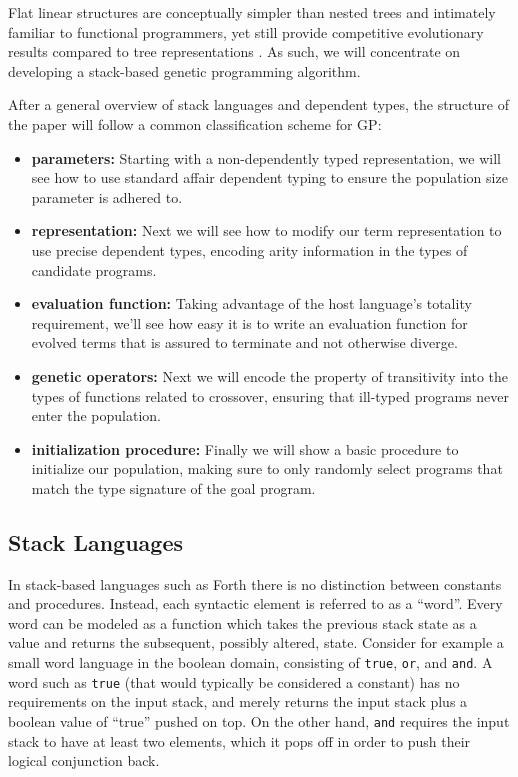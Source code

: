 \documentclass[runningheads,a4paper]{llncs}
\begin{document}
Flat linear structures are conceptually simpler than nested trees and
intimately familiar to functional programmers, yet still provide
competitive evolutionary results compared to tree representations
\cite{tchernev:crossmethods}. As such, we will concentrate on
developing a stack-based genetic programming algorithm.

After a general overview of stack languages and dependent types, the
structure of the paper will follow a common classification scheme for
GP:
\begin{itemize}
\item{\textbf{parameters:}} Starting with a non-dependently typed
  representation, we will see how to use standard affair dependent
  typing to ensure the population size parameter is adhered to.
\item{\textbf{representation:}} Next we will see how to modify our
  term representation to use precise dependent types, encoding arity
  information in the types of candidate programs.
\item{\textbf{evaluation function:}} Taking advantage of the host
  language's totality requirement, we'll see how easy it is to write
  an evaluation function for evolved terms that is assured to
  terminate and not otherwise diverge.
\item{\textbf{genetic operators:}} Next we will encode
  the property of transitivity into the types of functions related to
  crossover, ensuring that ill-typed programs never enter the
  population.
\item{\textbf{initialization procedure:}} Finally we will show a basic
  procedure to initialize our population, making sure to only randomly
  select programs that match the type signature of the goal program.
\end{itemize}

\subsection{Stack Languages}

In stack-based languages such as Forth \cite{kelly:forth} there is no
distinction between constants and procedures. Instead, each syntactic
element is referred to as a ``word''. Every word can be modeled as a
function which takes the previous stack state as a value and returns
the subsequent, possibly altered, state. Consider for example a
small word language in the boolean domain, consisting of \texttt{true},
\texttt{or}, and \texttt{and}. A word
such as \texttt{true} (that would typically be considered a constant)
has no requirements on the input stack, and merely returns the input
stack plus a boolean value of ``true'' pushed on top. On the other
hand, \texttt{and} requires the input stack to have at least two elements,
which it pops off in order to push their logical conjunction
back.
\end{document}

